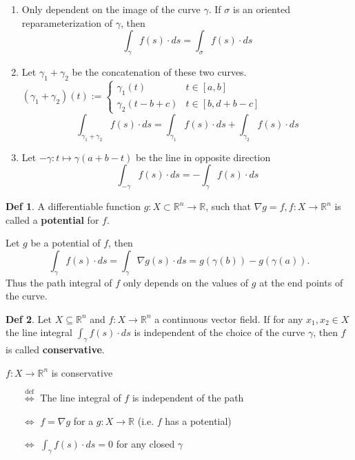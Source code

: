 \documentclass[a4paper, 10pt]{article}
\theoremstyle{definition}
\newtheorem*{definition}{Def}
\newcommand{\R}{\mathbb{R}}
\begin{document}
\begin{ntheorem*}
    \begin{enumerate}[leftmargin=15pt]
        \item Only dependent on the image of the curve \(\gamma\). If \(\sigma\) is an oriented reparameterization of \(\gamma\), then
        \[\int_\gamma f(s) \cdot ds = \int_\sigma f(s) \cdot ds\]
        \item Let \(\gamma_1 + \gamma_2\) be the concatenation of these two curves. \((\gamma_1 + \gamma_2)(t) := \begin{cases}
            \gamma_1(t) & t \in [a, b] \\
            \gamma_2(t - b + c) & t \in [b, d + b - c]
        \end{cases}\)
        \[\int_{\gamma_1 + \gamma_2} f(s) \cdot ds = \int_{\gamma_1} f(s) \cdot ds + \int_{\gamma_2} f(s) \cdot ds\]
        \item Let \(-\gamma: t \mapsto \gamma(a + b - t)\) be the line in opposite direction
        \[\int_{-\gamma} f(s) \cdot ds = - \int_\gamma f(s) \cdot ds\]
    \end{enumerate}
\end{ntheorem*}

\begin{definition}
    A differentiable function \(g: X \subset \R^n \to \R\), such that \(\nabla g = f, f : X \to \R^n\) is called a \textbf{potential} for \(f\).
\end{definition}

\begin{note*}
    Let \(g\) be a potential of \(f\), then
    \[\int_\gamma f(s) \cdot ds = \int_\gamma \nabla g(s) \cdot ds = g(\gamma(b)) - g(\gamma(a)).\]
    Thus the path integral of \(f\) only depends on the values of \(g\) at the end points of the curve.
\end{note*}

\begin{definition}
    Let \(X \subseteq \R^n\) and \(f: X \to \R^n\) a continuous vector field. If for any \(x_1, x_2 \in X\) the line integral \(\int_\gamma f(s) \cdot ds\) is independent of the choice of the curve \(\gamma\), then \(f\) is called \textbf{conservative}.
\end{definition}

\begin{ntheorem*}
    \(f: X \to \R^n\) is conservative
    \begin{enumerate}
        \item[\(\stackrel{\text{def}}{\iff}\)] The line integral of \(f\) is independent of the path
        \item[\(\iff\)] \(f = \nabla g\) for a \(g: X \to \R\) (i.e. \(f\) has a potential)
        \item[\(\iff\)] \(\int_\gamma f(s) \cdot ds = 0\) for any closed \(\gamma\)
    \end{enumerate}
\end{ntheorem*}
\end{document}
